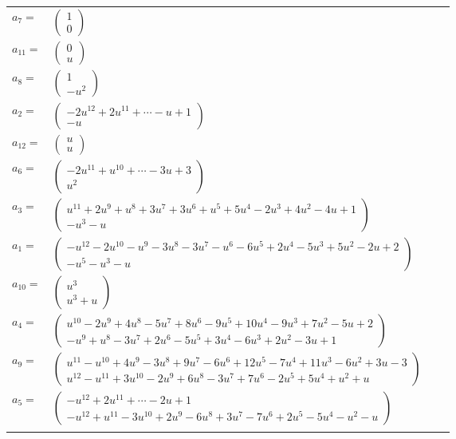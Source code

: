 \documentclass[1p]{elsarticle_modified}
\theoremstyle{definition}
\begin{document}
\begin{tabular}{m{7pt} m{180pt} m{7pt} m{180pt} }
\flushright $a_{7}=$&$\begin{pmatrix}1\\0\end{pmatrix}$ \\
\flushright $a_{11}=$&$\begin{pmatrix}0\\u\end{pmatrix}$ \\
\flushright $a_{8}=$&$\begin{pmatrix}1\\- u^2\end{pmatrix}$ \\
\flushright $a_{2}=$&$\begin{pmatrix}-2 u^{12}+2 u^{11}+\cdots- u+1\\- u\end{pmatrix}$ \\
\flushright $a_{12}=$&$\begin{pmatrix}u\\u\end{pmatrix}$ \\
\flushright $a_{6}=$&$\begin{pmatrix}-2 u^{11}+u^{10}+\cdots-3 u+3\\u^2\end{pmatrix}$ \\
\flushright $a_{3}=$&$\begin{pmatrix}u^{11}+2 u^9+u^8+3 u^7+3 u^6+u^5+5 u^4-2 u^3+4 u^2-4 u+1\\- u^3- u\end{pmatrix}$ \\
\flushright $a_{1}=$&$\begin{pmatrix}- u^{12}-2 u^{10}- u^9-3 u^8-3 u^7- u^6-6 u^5+2 u^4-5 u^3+5 u^2-2 u+2\\- u^5- u^3- u\end{pmatrix}$ \\
\flushright $a_{10}=$&$\begin{pmatrix}u^3\\u^3+u\end{pmatrix}$ \\
\flushright $a_{4}=$&$\begin{pmatrix}u^{10}-2 u^9+4 u^8-5 u^7+8 u^6-9 u^5+10 u^4-9 u^3+7 u^2-5 u+2\\- u^9+u^8-3 u^7+2 u^6-5 u^5+3 u^4-6 u^3+2 u^2-3 u+1\end{pmatrix}$ \\
\flushright $a_{9}=$&$\begin{pmatrix}u^{11}- u^{10}+4 u^9-3 u^8+9 u^7-6 u^6+12 u^5-7 u^4+11 u^3-6 u^2+3 u-3\\u^{12}- u^{11}+3 u^{10}-2 u^9+6 u^8-3 u^7+7 u^6-2 u^5+5 u^4+u^2+u\end{pmatrix}$ \\
\flushright $a_{5}=$&$\begin{pmatrix}- u^{12}+2 u^{11}+\cdots-2 u+1\\- u^{12}+u^{11}-3 u^{10}+2 u^9-6 u^8+3 u^7-7 u^6+2 u^5-5 u^4- u^2- u\end{pmatrix}$\\&\end{tabular}
\end{document}
